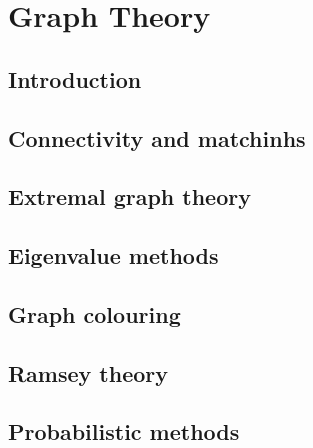 \documentclass[main.tex]{subfiles}
\begin{document}
	\chapter{Graph Theory}
		\section{Introduction}
		
		\section{Connectivity and matchinhs}
		
		\section{Extremal graph theory}
		
		\section{Eigenvalue methods}
		
		\section{Graph colouring}
		
		\section{Ramsey theory}
		
		\section{Probabilistic methods}		
\end{document}
